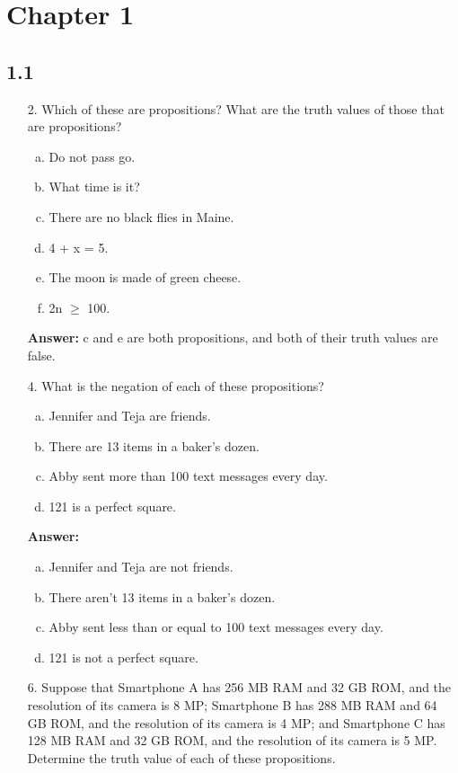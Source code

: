 \section{Chapter 1}
\subsection{1.1}
\begin{itemize}
\item[2.]Which of these are propositions? What are the truth values of those that are propositions?
\begin {enumerate}[a.]
\item Do not pass go.
\item What time is it?
\item There are no black flies in Maine.
\item 4 + x = 5.
\item The moon is made of green cheese.
\item 2n $\geq$ 100.
\end{enumerate}
\textbf{Answer:} c and e are both propositions, and both of their truth values are false. 
\item[4.]What is the negation of each of these propositions?
\begin{enumerate}[a.]
\item Jennifer and Teja are friends.
\item There are 13 items in a baker’s dozen.
\item Abby sent more than 100 text messages every day.
\item 121 is a perfect square.
\end{enumerate}
\textbf{Answer:}
\begin{enumerate}[a.]
\item Jennifer and Teja are not friends.
\item There aren’t 13 items in a baker’s dozen.
\item Abby sent less than or equal to 100 text messages every day.
\item 121 is not a perfect square.
\end{enumerate}
\item[6.]Suppose that Smartphone A has 256 MB RAM and 32 GB ROM, and the resolution of its camera is 8 MP; Smartphone B has 288 MB RAM and 64 GB ROM, and the resolution of its camera is 4 MP; and Smartphone C has 128 MB RAM and 32 GB ROM, and the resolution of
its camera is 5 MP. Determine the truth value of each of these propositions.
\begin{enumerate}[a.]

\end{enumerate}
\end{itemize}
